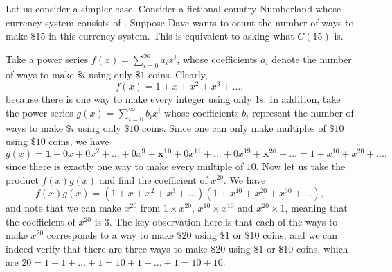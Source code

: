 Let us consider a simpler case. Consider a fictional country Numberland whose currency system consists of \NTen. Suppose Dave wants to count the number of ways to make  $\$ 15$ in this currency system. This is equivalent to asking what $C(15)$ is.

Take a power series $f(x) = \sum_{i=0}^{\infty} a_ix^{i}$, whose coefficients $a_i$ denote the number of ways to make $\$ i$ using only $\$1$ coins. Clearly, \[
  f(x) = 1 + x + x^{2} + x^{3} + \dots
,\] because there is one way to make every integer using only $1$s. In addition, take the power series $g(x) = \sum_{i=0}^{\infty} b_ix^{i}$ whose coefficients $b_i$ represent the number of ways to make $\$ i$ using only $\$ 10$ coins. Since one can only make multiples of $\$10$ using $\$10$ coins, we have \[
g(x) = \bm{1} + 0x + 0x^2 + \dots + 0x^{9} + \bm{x^{10}} + 0x^{11} + \dots + 0x^{19} + \bm{x^{20}} + \dots = 1 + x^{10} + x^{20} + \dots
,\] since there is exactly one way to make every multiple of $10$. Now let us take the product $f(x)g(x)$ and find the coefficient of $x^{20}$. We have \[
  f(x)g(x) = (1+x+x^{2}+x^{3} + \dots) (1+x^{10} + x^{20} + x^{30} + \dots)
,\] and note that we can make $x^{20}$ from $1\times x^{20}$, $x^{10}\times x^{10}$ and $x^{20}\times 1$, meaning that the coefficient of $x^{20}$ is $3$. The key observation here is that each of the ways to make $x^{20}$ corresponds to a way to make $\$20$ using $\$1$ or $\$10$ coins, and we can indeed verify that there are three ways to make $\$20$ using $\$1$ or $\$10$ coins, which are $20 = 1 + 1 + \dots + 1 = 10 + 1 + \dots + 1 = 10 + 10$.

